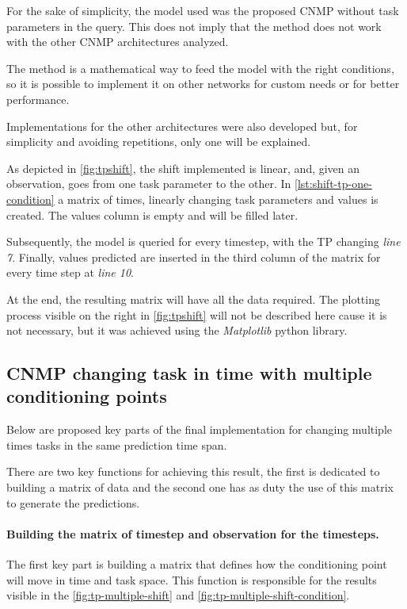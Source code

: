 For the sake of simplicity, the model used was the proposed CNMP without task parameters in the query. This does not imply that the method does not work with the other CNMP architectures analyzed. 

The method is a mathematical way to feed the model with the right conditions, so it is possible to implement it on other networks for custom needs or for better performance.

Implementations for the other architectures were also developed but, for simplicity and avoiding repetitions, only one will be explained. 

As depicted in \cref{fig:tpshift}, the shift implemented is linear, and, given an observation, goes from one task parameter to the other. In \cref{lst:shift-tp-one-condition} a matrix of times, linearly changing task parameters and values is created. The values column is empty and will be filled later.

Subsequently, the model is queried for every timestep, with the TP changing \emph{line 7}. 
Finally, values predicted are inserted in the third column of the matrix for every time step at \emph{line 10}. 

At the end, the resulting matrix will have all the data required. The plotting process visible on the right in \cref{fig:tpshift} will not be described here cause it is not necessary, but it was achieved using the \emph{Matplotlib} python library.  




\subsection{CNMP changing task in time with multiple conditioning points}
Below are proposed key parts of the final implementation for changing multiple times tasks in the same prediction time span.

There are two key functions for achieving this result, the first is dedicated to building a matrix of data and the second one has as duty the use of this matrix to generate the predictions. 

\paragraph{Building the matrix of timestep and observation for the timesteps. }
The first key part is building a matrix that defines how the conditioning point will move in time and task space. This function is responsible for the results visible in the \cref{fig:tp-multiple-shift} and \cref{fig:tp-multiple-shift-condition}. 

